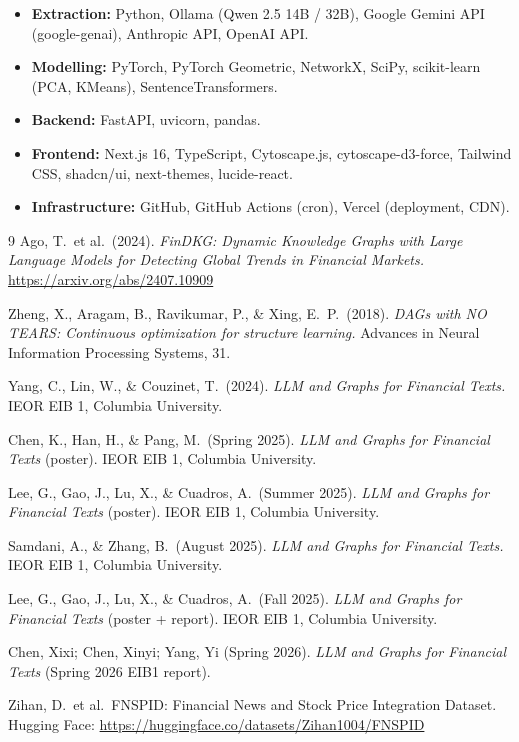\documentclass[11pt]{article}
\begin{document}
\begin{itemize}
  \item \textbf{Extraction:} Python, Ollama (Qwen 2.5 14B / 32B), Google Gemini API (google-genai), Anthropic API, OpenAI API.
  \item \textbf{Modelling:} PyTorch, PyTorch Geometric, NetworkX, SciPy, scikit-learn (PCA, KMeans), SentenceTransformers.
  \item \textbf{Backend:} FastAPI, uvicorn, pandas.
  \item \textbf{Frontend:} Next.js 16, TypeScript, Cytoscape.js, cytoscape-d3-force, Tailwind CSS, shadcn/ui, next-themes, lucide-react.
  \item \textbf{Infrastructure:} GitHub, GitHub Actions (cron), Vercel (deployment, CDN).
\end{itemize}

\begin{thebibliography}{9}
Ago, T.\ et al.\ (2024). \emph{FinDKG: Dynamic Knowledge Graphs with Large Language Models for Detecting Global Trends in Financial Markets.} \url{https://arxiv.org/abs/2407.10909}

Zheng, X., Aragam, B., Ravikumar, P., \& Xing, E.\ P.\ (2018). \emph{DAGs with NO TEARS: Continuous optimization for structure learning.} Advances in Neural Information Processing Systems, 31.

Yang, C., Lin, W., \& Couzinet, T.\ (2024). \emph{LLM and Graphs for Financial Texts.} IEOR EIB 1, Columbia University.

Chen, K., Han, H., \& Pang, M.\ (Spring 2025). \emph{LLM and Graphs for Financial Texts} (poster). IEOR EIB 1, Columbia University.

Lee, G., Gao, J., Lu, X., \& Cuadros, A.\ (Summer 2025). \emph{LLM and Graphs for Financial Texts} (poster). IEOR EIB 1, Columbia University.

Samdani, A., \& Zhang, B.\ (August 2025). \emph{LLM and Graphs for Financial Texts.} IEOR EIB 1, Columbia University.

Lee, G., Gao, J., Lu, X., \& Cuadros, A.\ (Fall 2025). \emph{LLM and Graphs for Financial Texts} (poster + report). IEOR EIB 1, Columbia University.

Chen, Xixi; Chen, Xinyi; Yang, Yi (Spring 2026). \emph{LLM and Graphs for Financial Texts} (Spring 2026 EIB1 report).

Zihan, D.\ et al.\ FNSPID: Financial News and Stock Price Integration Dataset. Hugging Face: \url{https://huggingface.co/datasets/Zihan1004/FNSPID}
\end{thebibliography}
\end{document}
